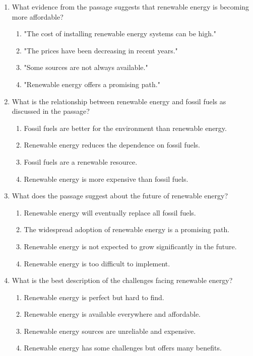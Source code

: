 \documentclass[12pt]{article}
\begin{document}
\begin{enumerate}
    \item What evidence from the passage suggests that renewable energy is becoming more affordable?
    \begin{enumerate}[label=\Alph*.]
        \item "The cost of installing renewable energy systems can be high."
        \item "The prices have been decreasing in recent years."
        \item "Some sources are not always available."
        \item "Renewable energy offers a promising path."
    \end{enumerate}
    \vspace{0.5cm}

    \item What is the relationship between renewable energy and fossil fuels as discussed in the passage?
    \begin{enumerate}[label=\Alph*.]
        \item Fossil fuels are better for the environment than renewable energy.
        \item Renewable energy reduces the dependence on fossil fuels.
        \item Fossil fuels are a renewable resource.
        \item Renewable energy is more expensive than fossil fuels.
    \end{enumerate}
    \vspace{0.5cm}

    \item What does the passage suggest about the future of renewable energy?
    \begin{enumerate}[label=\Alph*.]
        \item Renewable energy will eventually replace all fossil fuels.
        \item The widespread adoption of renewable energy is a promising path.
        \item Renewable energy is not expected to grow significantly in the future.
        \item Renewable energy is too difficult to implement.
    \end{enumerate}
    \vspace{0.5cm}

    \item What is the best description of the challenges facing renewable energy?
    \begin{enumerate}[label=\Alph*.]
        \item Renewable energy is perfect but hard to find.
        \item Renewable energy is available everywhere and affordable.
        \item Renewable energy sources are unreliable and expensive.
        \item Renewable energy has some challenges but offers many benefits.
    \end{enumerate}
    \vspace{0.5cm}


\end{enumerate}
\end{document}
